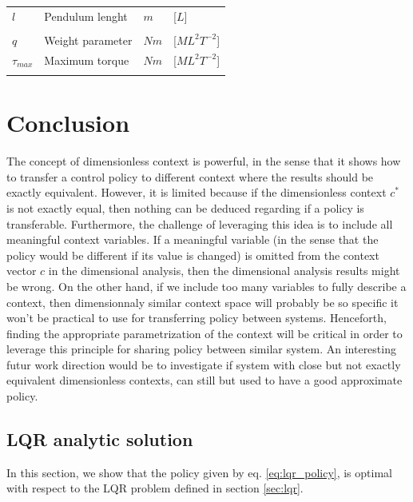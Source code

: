 \begin{table}[htb]
\begin{tabular}{p{0.8cm} p{2.5cm} p{0.8cm} p{1.5cm} }
   $l$ & Pendulum lenght & $m$ & [$L$]  \\ \noalign{\smallskip} \hline \noalign{\smallskip}
   \hline \hline \noalign{\smallskip} 
   \multicolumn{4}{c}{\textbf{Problem parameters}}\\ \noalign{\smallskip}  \hline\hline  \noalign{\smallskip} 
   $q$ & Weight parameter  & $Nm$ & [$ML^2T^{-2}$]   \\ \noalign{\smallskip} \hline \noalign{\smallskip}
   $\tau_{max}$ & Maximum torque & $Nm$ & [$ML^2T^{-2}$] \\ \noalign{\smallskip} \hline \noalign{\smallskip}
   \hline \noalign{\smallskip}
   \end{tabular}
\end{table}

\section{Conclusion}

The concept of dimensionless context is powerful, in the sense that it shows how to transfer a control policy to different context where the results should be exactly equivalent. However, it is limited because if the dimensionless context $c^*$ is not exactly equal, then nothing can be deduced regarding if a policy is transferable. Furthermore, the challenge of leveraging this idea is to include all meaningful context variables. If a meaningful variable (in the sense that the policy would be different if its value is changed) is omitted from the context vector $c$ in the dimensional analysis, then the dimensional analysis results might be wrong. On the other hand, if we include too many variables to fully describe a context, then dimensionnaly similar context space will probably be so specific it won't be practical to use for transferring policy between systems. Henceforth, finding the appropriate parametrization of the context will be critical in order to leverage this principle for sharing policy between similar system. An interesting futur work direction would be to investigate if system with close but not exactly equivalent dimensionless contexts, can still but used to have a good approximate policy.

\appendix
\subsection{LQR analytic solution}
\label{sec:lqr_proof}
In this section, we show that the policy given by eq. \eqref{eq:lqr_policy}, is optimal with respect to the LQR problem defined in section \ref{sec:lqr}.

